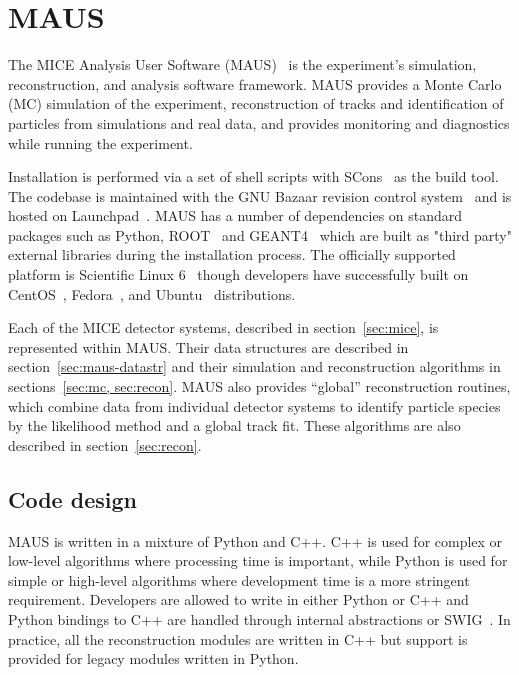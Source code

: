 \documentclass{JINST}
\begin{document}
\section{MAUS}\label{sec:maus}

The MICE  Analysis User Software (MAUS)~\cite{MausIPAC11} is the experiment's simulation, reconstruction, and  analysis software framework. MAUS provides a Monte Carlo (MC) simulation of the experiment, reconstruction of tracks and identification of particles from simulations and real data, and provides monitoring and diagnostics while running the experiment.

Installation is performed via a set of shell scripts with SCons~\cite{SCONS} as the build tool. The codebase is maintained with  the GNU Bazaar revision control system~\cite{bazaar} and is hosted on Launchpad~\cite{launchpad}. MAUS has a number of dependencies on standard packages such as Python, ROOT~\cite{ROOT} and GEANT4~\cite{GEANT4} which are built as "third party" external libraries during the installation process.  The officially supported platform is Scientific Linux 6~\cite{scilinux} though developers have successfully built on CentOS~\cite{centos}, Fedora~\cite{fedora}, and Ubuntu~\cite{ubuntu} distributions.

Each of the MICE detector systems, described in section~\ref{sec:mice}, is represented within MAUS. Their data structures are described in section~\ref{sec:maus-datastr} and their simulation and reconstruction algorithms in sections~\ref{sec:mc, sec:recon}. MAUS also provides ``global'' reconstruction routines, which combine data from individual detector systems to identify particle species by the likelihood method and a global track fit. These algorithms are also described in section~\ref{sec:recon}. 


\subsection{Code design}\label{sec:maus-arch}

MAUS is written in a mixture of Python and C++. C++ is used for complex or low-level algorithms where processing time is important, while Python is used for simple or high-level algorithms where development time is a more stringent requirement. Developers are allowed to write in either Python or C++ and Python bindings to C++ are handled through internal abstractions or SWIG~\cite{SWIG}. In practice, all the reconstruction modules are written in C++ but support is provided for legacy modules written in Python.
\end{document}
